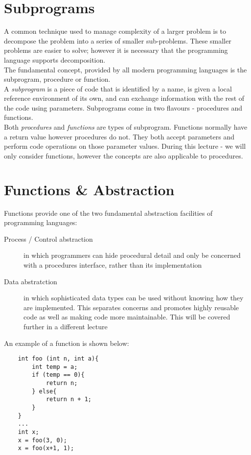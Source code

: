 
\section{Subprograms}
A common technique used to manage complexity of a larger problem is to decompose the problem into a series of smaller sub-problems. These smaller problems are easier to solve; however it is necessary that the programming language supports decomposition.\\

The fundamental concept, provided by all modern programming languages is the subprogram, procedure or function.\\

A \textit{subprogram} is a piece of code that is identified by a name, is given a local reference environment of its own, and can exchange information with the rest of the code using parameters. Subprograms come in two flavours - procedures and functions.\\

Both \textit{procedures} and \textit{functions} are types of subprogram. Functions normally have a return value however procedures do not. They both accept parameters and perform code operations on those parameter values. During this lecture - we will only consider functions, however the concepts are also applicable to procedures.


\section{Functions \& Abstraction}
Functions provide one of the two fundamental abstraction facilities of programming languages:

\begin{description}
    \item[Process / Control abstraction] in which programmers can hide procedural detail and only be concerned with a procedures interface, rather than its implementation
    \item[Data abstratction] in which sophisticated data types can be used without knowing how they are implemented. This separates concerns and promotes highly reusable code as well as making code more maintainable. This will be covered further in a different lecture 
\end{description}

An example of a function is shown below:
\begin{verbatim}
    int foo (int n, int a){
        int temp = a;
        if (temp == 0){
            return n;
        } else{
            return n + 1;
        }
    }
    ...
    int x;
    x = foo(3, 0);
    x = foo(x+1, 1);
\end{verbatim}

